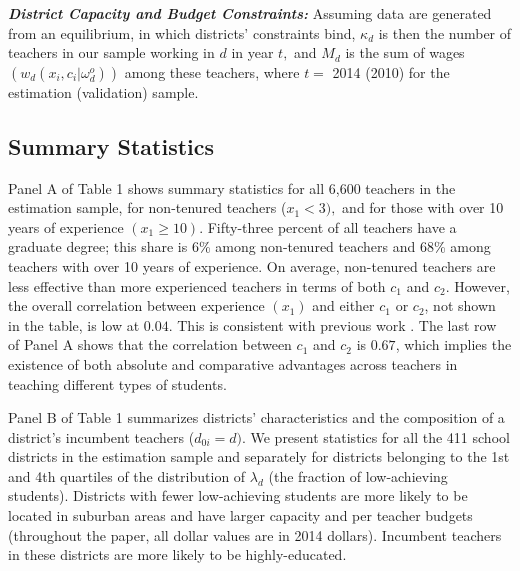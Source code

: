 \documentclass[notitlepage,12pt]{article}%
\begin{document}
\medskip\noindent\textit{\textbf{District Capacity and Budget Constraints:}}
Assuming data are generated from an equilibrium, in which districts'
constraints bind, $\kappa_{d}$ is then the number of teachers in our sample
working in $d$ in year $t,$ and $M_{d}$ is the sum of wages $\left(
w_{d}\left(  x_{i},c_{i}|\omega_{d}^{o}\right)  \right)  $ among these
teachers, where $t=$ 2014 (2010) for the estimation (validation) sample.

\subsection{Summary Statistics\label{sum}}

Panel A of Table 1 shows summary statistics for all 6,600 teachers in the
estimation sample, for non-tenured teachers ($x_{1}<3),$ and for those with
over 10 years of experience $\left(  x_{1}\geq10\right)  $. Fifty-three
percent of all teachers have a graduate degree; this share is 6\% among
non-tenured teachers and 68\% among teachers with over 10 years of experience.
On average, non-tenured teachers are less effective than more experienced
teachers in terms of both $c_{1}$ and $c_{2}$. However, the overall
correlation between experience $\left(  x_{1}\right)  $ and either $c_{1}$ or
$c_{2}$, not shown in the table, is low at $0.04$. This is consistent with
previous work \citep[e.g.,][]{rockoff2004impact}. The last row of Panel A
shows that the correlation between $c_{1}$ and $c_{2}$ is $0.67$, which
implies the existence of both absolute and comparative advantages across
teachers in teaching different types of students.

Panel B of Table 1 summarizes districts' characteristics and the composition
of a district's incumbent teachers ($d_{0i}=d)$. We present statistics for all
the 411 school districts in the estimation sample and separately for districts
belonging to the 1st and 4th quartiles of the distribution of $\lambda_{d}$
(the fraction of low-achieving students). Districts with fewer low-achieving
students are more likely to be located in suburban areas and have larger
capacity and per teacher budgets (throughout the paper, all dollar values are
in 2014 dollars). Incumbent teachers in these districts are more likely to be highly-educated.
\end{document}
